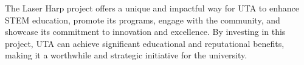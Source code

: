 The Laser Harp project offers a unique and impactful way for UTA to enhance STEM education, promote its programs, engage with the community, and showcase its commitment to innovation and excellence. By investing in this project, UTA can achieve significant educational and reputational benefits, making it a worthwhile and strategic initiative for the university.
